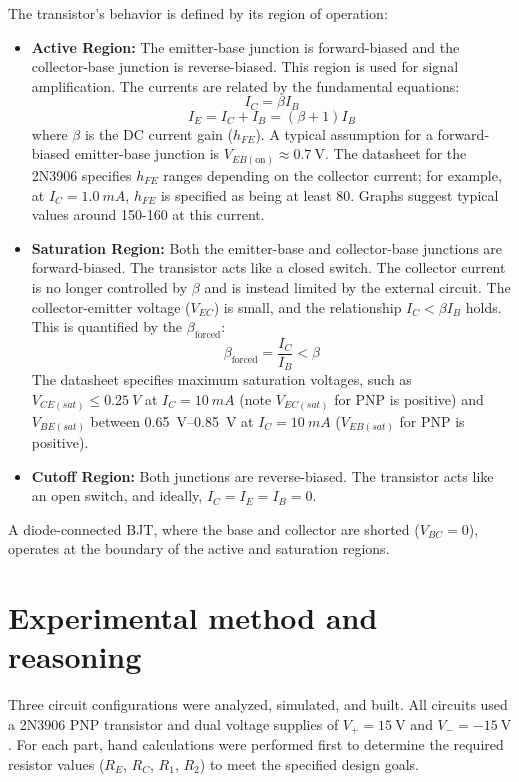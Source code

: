 \documentclass[12pt]{article}
\begin{document}
The transistor's behavior is defined by its region of operation:
\begin{itemize}
  \item \textbf{Active Region:} The emitter-base junction is forward-biased and the collector-base junction is reverse-biased. This region is used for signal amplification. The currents are related by the fundamental equations:
    $$I_C = \beta I_B$$
    $$I_E = I_C + I_B = (\beta + 1)I_B$$
    where $\beta$ is the DC current gain ($h_{FE}$). A typical assumption for a forward-biased emitter-base junction is $V_{EB(\text{on})} \approx \SI{0.7}{\volt}$. The datasheet for the 2N3906 specifies $h_{FE}$ ranges depending on the collector current; for example, at $I_C = \SI{1.0}{mA}$, $h_{FE}$ is specified as being at least 80. Graphs suggest typical values around 150-160 at this current.

  \item \textbf{Saturation Region:} Both the emitter-base and collector-base junctions are forward-biased. The transistor acts like a closed switch. The collector current is no longer controlled by $\beta$ and is instead limited by the external circuit. The collector-emitter voltage ($V_{EC}$) is small, and the relationship $I_C < \beta I_B$ holds. This is quantified by the $\beta_{\text{forced}}$:
    $$\beta_{\text{forced}} = \frac{I_C}{I_B} < \beta$$
    The datasheet specifies maximum saturation voltages, such as $V_{CE(sat)} \leq \SI{0.25}{V}$ at $I_C = \SI{10}{mA}$ (note $V_{EC(sat)}$ for PNP is positive) and $V_{BE(sat)}$ between \SIrange{0.65}{0.85}{V} at $I_C = \SI{10}{mA}$ ($V_{EB(sat)}$ for PNP is positive).

  \item \textbf{Cutoff Region:} Both junctions are reverse-biased. The transistor acts like an open switch, and ideally, $I_C = I_E = I_B = 0$.
\end{itemize}
A diode-connected BJT, where the base and collector are shorted ($V_{BC} = 0$), operates at the boundary of the active and saturation regions.

\section{Experimental method and reasoning}
Three circuit configurations were analyzed, simulated, and built. All circuits used a 2N3906 PNP transistor and dual voltage supplies of $V_{+} = \SI{15}{\volt}$ and $V_{-} = \SI{-15}{\volt}$. For each part, hand calculations were performed first to determine the required resistor values ($R_E$, $R_C$, $R_1$, $R_2$) to meet the specified design goals.
\end{document}
